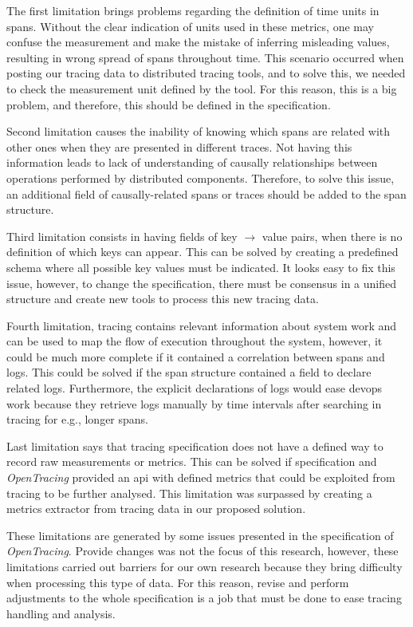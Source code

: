 The first limitation brings problems regarding the definition of time units in spans. Without the clear indication of units used in these metrics, one may confuse the measurement and make the mistake of inferring misleading values, resulting in wrong spread of spans throughout time. This scenario occurred when posting our tracing data to distributed tracing tools, and to solve this, we needed to check the measurement unit defined by the tool. For this reason, this is a big problem, and therefore, this should be defined in the specification.

Second limitation causes the inability of knowing which spans are related with other ones when they are presented in different traces. Not having this information leads to lack of understanding of causally relationships between operations performed by distributed components. Therefore, to solve this issue, an additional field of causally-related spans or traces should be added to the span structure.

Third limitation consists in having fields of key $\rightarrow$ value pairs, when there is no definition of which keys can appear. This can be solved by creating a predefined schema where all possible key values must be indicated. It looks easy to fix this issue, however, to change the specification, there must be consensus in a unified structure and create new tools to process this new tracing data.

Fourth limitation, tracing contains relevant information about system work and can be used to map the flow of execution throughout the system, however, it could be much more complete if it contained a correlation between spans and logs. This could be solved if the span structure contained a field to declare related logs. Furthermore, the explicit declarations of logs would ease \gls{devops} work because they retrieve logs manually by time intervals after searching in tracing for e.g., longer spans.

Last limitation says that tracing specification does not have a defined way to record raw measurements or metrics. This can be solved if specification and \emph{OpenTracing} provided an \gls{api} with defined metrics that could be exploited from tracing to be further analysed. This limitation was surpassed by creating a metrics extractor from tracing data in our proposed solution.

These limitations are generated by some issues presented in the specification of \emph{OpenTracing}. Provide changes was not the focus of this research, however, these limitations carried out barriers for our own research because they bring difficulty when processing this type of data. For this reason, revise and perform adjustments to the whole specification is a job that must be done to ease tracing handling and analysis.

